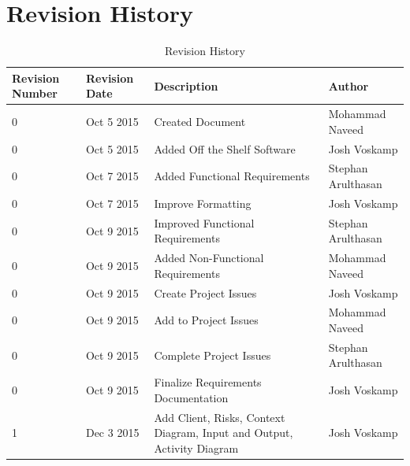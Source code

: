 \documentclass[12pt]{article}
\begin{document}
\begin{titlepage}



\vfill %

\end{titlepage}

\newpage
\tableofcontents
\newpage
\listoftables
{}
\newpage
\listoffigures
{}
\newpage

\section*{Revision History}
\begin{table}[H]
	\centering
	\begin{tabular}{ | p{2cm} |  p{2cm} | p{5cm} | p{3.8cm} |}
	    \hline
	    Revision Number & Revision Date & Description & Author \\ \hline
		0 & Oct 5 2015 & Created Document & Mohammad Naveed \\\hline
		0 & Oct 5 2015 & Added Off the Shelf Software & Josh Voskamp \\\hline
		0 & Oct 7 2015 & Added Functional Requirements & Stephan Arulthasan\\\hline
		0 & Oct 7 2015 & Improve Formatting & Josh Voskamp \\\hline
		0 & Oct 9 2015 & Improved Functional Requirements & Stephan Arulthasan \\\hline
		0 & Oct 9 2015 & Added Non-Functional Requirements & Mohammad Naveed \\\hline
		0 & Oct 9 2015 & Create Project Issues & Josh Voskamp \\\hline
		0 & Oct 9 2015 & Add to Project Issues & Mohammad Naveed \\\hline
		0 & Oct 9 2015 & Complete Project Issues & Stephan Arulthasan \\\hline
		0 & Oct 9 2015 & Finalize Requirements Documentation & Josh Voskamp \\\hline
        \color{red} 1 &\color{red} Dec 3 2015 &\color{red} Add Client, Risks, Context Diagram, Input and Output, Activity Diagram &\color{red} Josh Voskamp \\\hline
	\end{tabular}
	\caption{Revision History}
\end{table}
\newpage
\end{document}
